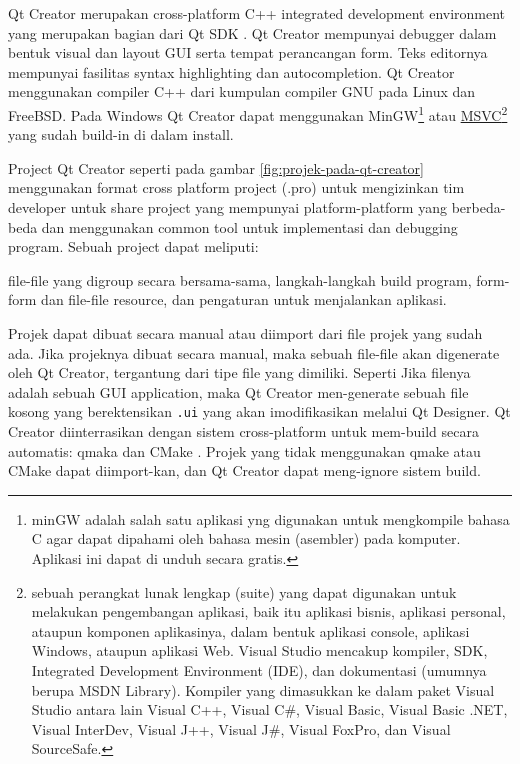 Qt Creator merupakan cross-platform C++ integrated development
environment yang merupakan bagian dari Qt SDK . Qt Creator mempunyai
debugger dalam bentuk visual dan layout GUI  serta tempat perancangan
form. Teks editornya mempunyai fasilitas syntax highlighting dan
autocompletion. Qt Creator menggunakan compiler C++ dari kumpulan
compiler GNU pada Linux dan FreeBSD. Pada Windows  Qt Creator dapat
menggunakan MinGW\footnote{minGW adalah salah satu aplikasi yng
  digunakan untuk mengkompile bahasa C agar dapat dipahami oleh bahasa
  mesin (asembler) pada komputer. Aplikasi ini dapat di unduh secara
  gratis.} atau
\href{https://id.wikipedia.org/wiki/Microsoft_Visual_Studio_Express}{MSVC}\footnote{sebuah perangkat lunak lengkap (suite) yang dapat digunakan untuk melakukan pengembangan aplikasi, baik itu aplikasi bisnis, aplikasi personal, ataupun komponen aplikasinya, dalam bentuk aplikasi console, aplikasi Windows, ataupun aplikasi Web. Visual Studio mencakup kompiler, SDK, Integrated Development Environment (IDE), dan dokumentasi (umumnya berupa MSDN Library). Kompiler yang dimasukkan ke dalam paket Visual Studio antara lain Visual C++, Visual C\#, Visual Basic, Visual Basic .NET, Visual InterDev, Visual J++, Visual J\#, Visual FoxPro, dan Visual SourceSafe.}
yang sudah build-in di dalam install.

Project Qt Creator seperti pada gambar \ref{fig:projek-pada-qt-creator}
 menggunakan format cross platform project (.pro)
untuk mengizinkan tim developer untuk share project yang mempunyai
platform-platform yang berbeda-beda dan menggunakan common tool untuk
implementasi dan debugging program. Sebuah project dapat meliputi:

file-file yang digroup secara bersama-sama, langkah-langkah build
program, form-form dan file-file resource, dan pengaturan untuk
menjalankan aplikasi.

Projek dapat dibuat secara manual atau diimport dari file projek yang
sudah ada. Jika projeknya dibuat secara manual, maka sebuah file-file
akan digenerate oleh Qt Creator, tergantung dari tipe file yang
dimiliki. Seperti Jika filenya adalah sebuah GUI application, maka Qt
Creator men-generate sebuah file kosong yang berektensikan \texttt{.ui}
yang akan imodifikasikan melalui Qt Designer. Qt Creator diinterrasikan
dengan sistem cross-platform untuk mem-build secara automatis: qmaka dan CMake
. Projek yang tidak menggunakan qmake atau CMake dapat
diimport-kan, dan Qt Creator dapat meng-ignore sistem build.

